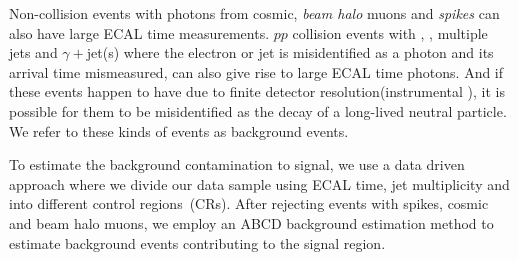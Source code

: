 \par 
Non-collision events with photons from cosmic, \textit{beam halo} muons and \textit{spikes} can also have large ECAL time measurements. $pp$ collision events with \PW, \PZ, multiple jets and $\gamma +$jet(s) where the electron or jet is misidentified as a photon and its arrival time mismeasured, can also give rise to large ECAL time photons. And if these events happen to have \MET due to finite detector resolution(\ie instrumental \MET), it is possible for them to be misidentified as the decay of a long-lived neutral particle. We refer to these kinds of events as background events.
\par 
To estimate the background contamination to signal, we  use a data driven approach where we divide our data sample using ECAL time, jet multiplicity and \MET into different control regions~(CRs). After rejecting events with spikes, cosmic and beam halo muons, we employ an \textsf{ABCD} background estimation method to estimate background events contributing to the signal region. 
